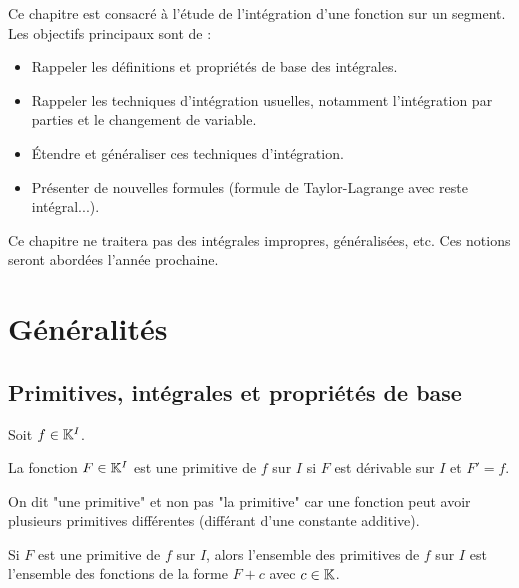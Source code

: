 \documentclass[12pt, a4paper]{report}
\begin{document}

\tableofcontents
\clearpage

\vspace*{\fill}
Ce chapitre est consacré à l'étude de l'intégration d'une fonction sur un segment. Les objectifs principaux sont de :
\begin{itemize}
    \item Rappeler les définitions et propriétés de base des intégrales.
    \item Rappeler les techniques d'intégration usuelles, notamment l'intégration par parties et le changement de variable.
    \item Étendre et généraliser ces techniques d'intégration.
    \item Présenter de nouvelles formules (formule de Taylor-Lagrange avec reste intégral...).
\end{itemize}

Ce chapitre ne traitera pas des intégrales impropres, généralisées, etc. Ces notions seront abordées l'année prochaine.
\vspace*{\fill}

\newpage

\chapter{Généralités}

\section{Primitives, intégrales et propriétés de base}

\begin{definition}[Primitives]
    Soit $f\in\mathbb{K}^I$.

    La fonction $F\in\mathbb{K}^I$ est une primitive de $f$ sur $I$ si $F$ est dérivable sur $I$ et $F'=f$.

    On dit "une primitive" et non pas "la primitive" car une fonction peut avoir plusieurs primitives différentes (différant d'une constante additive).

    Si $F$ est une primitive de $f$ sur $I$, alors l'ensemble des primitives de $f$ sur $I$ est l'ensemble des fonctions de la forme $F+c$ avec $c\in\mathbb{K}$.
\end{definition}
\end{document}
